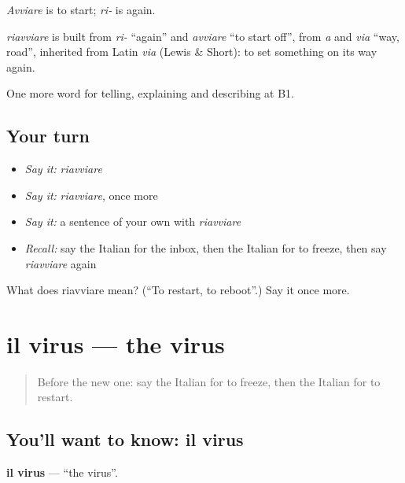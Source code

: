 \emph{Avviare} is to start; \emph{ri-} is again.

\begin{cousinweb}
\emph{riavviare} is built from \emph{ri-} \textquotedblleft{}again\textquotedblright{} and \emph{avviare} \textquotedblleft{}to start off\textquotedblright{}, from \emph{a} and \emph{via} \textquotedblleft{}way, road\textquotedblright{}, inherited from Latin \emph{via} (Lewis \& Short): to set something on its way again.
\end{cousinweb}

\begin{grammarlens}[title={What you've built}]
One more word for telling, explaining and describing at B1.
\end{grammarlens}

\subsection*{Your turn}
\begin{itemize}
\raggedright
  \item \emph{Say it:} \emph{riavviare}
  \item \emph{Say it:} \emph{riavviare}, once more
  \item \emph{Say it:} a sentence of your own with \emph{riavviare}
  \item \emph{Recall:} say the Italian for the inbox, then the Italian for to freeze, then say \emph{riavviare} again
\end{itemize}

\begin{tcolorbox}[breakable,colback=teal!4,colframe=teal!35!black,title={Before you move on}]
What does riavviare mean? (\textquotedblleft{}To restart, to reboot\textquotedblright{}.) Say it once more.
\end{tcolorbox}
\section[il virus]{il virus — the virus}

\label{lesson:IT-C404-virus}



\begin{quote}
Before the new one: say the Italian for to freeze, then the Italian for to restart.
\end{quote}

\subsection*{You'll want to know: il virus}
\textbf{il virus} — \textquotedblleft{}the virus\textquotedblright{}.


